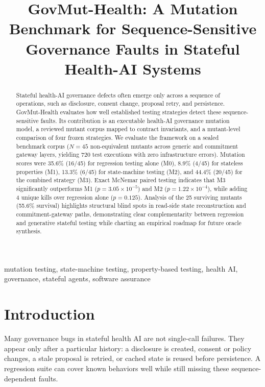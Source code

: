 \documentclass[conference]{IEEEtran}
\begin{document}
\title{GovMut-Health: A Mutation Benchmark for Sequence-Sensitive Governance Faults in Stateful Health-AI Systems}
\author{
}
\maketitle

\begin{abstract}
Stateful health-AI governance defects often emerge only across a sequence of operations, such as disclosure, consent change, proposal retry, and persistence. GovMut-Health evaluates how well established testing strategies detect these sequence-sensitive faults. Its contribution is an executable health-AI governance mutation model, a reviewed mutant corpus mapped to contract invariants, and a mutant-level comparison of four frozen strategies. We evaluate the framework on a sealed benchmark corpus ($N=45$ non-equivalent mutants across generic and commitment gateway layers, yielding 720 test executions with zero infrastructure errors). Mutation scores were 35.6\% (16/45) for regression testing alone (M0), 8.9\% (4/45) for stateless properties (M1), 13.3\% (6/45) for state-machine testing (M2), and 44.4\% (20/45) for the combined strategy (M3). Exact McNemar paired testing indicates that M3 significantly outperforms M1 ($p = 3.05 \times 10^{-5}$) and M2 ($p = 1.22 \times 10^{-4}$), while adding 4 unique kills over regression alone ($p = 0.125$). Analysis of the 25 surviving mutants (55.6\% survival) highlights structural blind spots in read-side state reconstruction and commitment-gateway paths, demonstrating clear complementarity between regression and generative stateful testing while charting an empirical roadmap for future oracle synthesis.
\end{abstract}

\begin{IEEEkeywords}
mutation testing, state-machine testing, property-based testing, health AI, governance, stateful agents, software assurance
\end{IEEEkeywords}

\section{Introduction}
Many governance bugs in stateful health AI are not single-call failures. They appear only after a particular history: a disclosure is created, consent or policy changes, a stale proposal is retried, or cached state is reused before persistence. A regression suite can cover known behaviors well while still missing these sequence-dependent faults.
\end{document}
